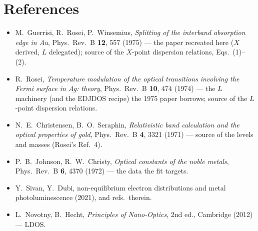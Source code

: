 \documentclass[11pt,a4paper]{article}
\numberwithin{equation}{section}
\begin{document}
\section*{References}
\begin{itemize}
\item M.~Guerrisi, R.~Rosei, P.~Winsemius, \emph{Splitting of the interband absorption edge in Au}, Phys.\ Rev.\ B \textbf{12}, 557 (1975) --- the paper recreated here ($X$ derived, $L$ delegated); source of the $X$-point dispersion relations, Eqs.~(1)--(2).
\item R.~Rosei, \emph{Temperature modulation of the optical transitions involving the Fermi surface in Ag: theory}, Phys.\ Rev.\ B \textbf{10}, 474 (1974) --- the $L$ machinery (and the EDJDOS recipe) the 1975 paper borrows; source of the $L$-point dispersion relations.
\item N.~E.~Christensen, B.~O.~Seraphin, \emph{Relativistic band calculation and the optical properties of gold}, Phys.\ Rev.\ B \textbf{4}, 3321 (1971) --- source of the levels and masses (Rosei's Ref.~4).
\item P.~B.~Johnson, R.~W.~Christy, \emph{Optical constants of the noble metals}, Phys.\ Rev.\ B \textbf{6}, 4370 (1972) --- the data the fit targets.
\item Y.~Sivan, Y.~Dubi, non-equilibrium electron distributions and metal photoluminescence (2021), and refs.\ therein.
\item L.~Novotny, B.~Hecht, \emph{Principles of Nano-Optics}, 2nd ed., Cambridge (2012) --- LDOS.
\end{itemize}
\end{document}
